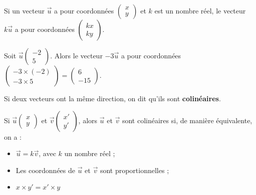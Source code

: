 \documentclass[
	classe=$2^{de}$
]{coursclass}
\begin{document}
\begin{propriete}
	Si un vecteur $\vec{u}$ a pour coordonnées $\begin{pmatrix} x \\ y \end{pmatrix}$ et $k$ est un nombre réel, le vecteur $k\vec{u}$ a pour coordonnées $\begin{pmatrix} kx \\ ky \end{pmatrix}$.
\end{propriete}

\begin{exemple}
	Soit $\vec{u}\begin{pmatrix} -2 \\ 5 \end{pmatrix}$. Alors le vecteur $-3\vec{u}$ a pour coordonnées $\begin{pmatrix} -3 × (-2) \\ -3 × 5 \end{pmatrix} = \begin{pmatrix} 6 \\ -15 \end{pmatrix}$.
\end{exemple}

\begin{definition}[Colinéarité]
	Si deux vecteurs ont la même direction, on dit qu'ils sont \textbf{colinéaires}.
\end{definition}

\begin{propriete}[Colinéarité]
	Si $\vec{u}\begin{pmatrix} x \\ y \end{pmatrix}$ et $\vec{v}\begin{pmatrix} x' \\ y' \end{pmatrix}$, alors $\vec{u}$ et $\vec{v}$ sont colinéaires si, de manière équivalente, on a : \medskip

	\begin{minipage}{0.7\textwidth}
		\begin{itemize}
			\item $\vec{u} = k\vec{v}$, avec $k$ un nombre réel ;
			\item Les coordonnées de $\vec{u}$ et $\vec{v}$ sont proportionnelles ;
			\item $x × y' = x' × y$
		\end{itemize}
	\end{minipage}
	\begin{minipage}{0.25\textwidth}
	\end{minipage}
\end{propriete}
\end{document}
